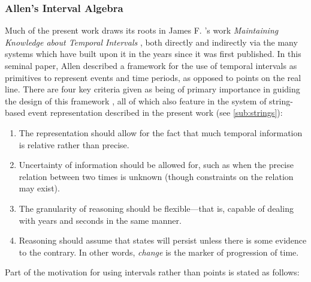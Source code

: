 \documentclass[a4paper,12pt,leqno]{article}
\begin{document}
\subsubsection{Allen's Interval Algebra}\label{ssub:allen}
Much of the present work draws its roots in James F. \citeauthor{allen1983maintaining}'s work \textit{Maintaining Knowledge about Temporal Intervals} \citeyearpar{allen1983maintaining}, both directly and indirectly via the many systems which have built upon it in the years since it was first published. In this seminal paper, Allen described a framework for the use of temporal intervals as primitives to represent events and time periods, as opposed to points on the real line. There are four key criteria given as being of primary importance in guiding the design of this framework \citeyearpar[p. 833]{allen1983maintaining}, all of which also feature in the system of string-based event representation described in the present work (see \cref{sub:strings}):
\begin{enumerate}\label{other:allen-motivations}
\onehalfspacing
\item The representation should allow for the fact that much temporal information is relative rather than precise.
\item Uncertainty of information should be allowed for, such as when the precise relation between two times is unknown (though constraints on the relation may exist).
\item The granularity of reasoning should be flexible---that is, capable of dealing with years and seconds in the same manner.
\item Reasoning should assume that states will persist unless there is some evidence to the contrary. In other words, \textit{change} is the marker of progression of time. 
\end{enumerate}
Part of the motivation for using intervals rather than points is stated as follows:
\end{document}
